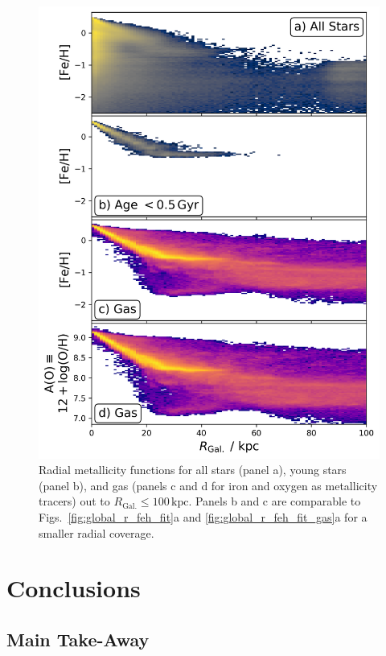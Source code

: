 \documentclass[fleqn,usenatbib]{mnras}
\begin{document}
\begin{figure}
    \centering
    \includegraphics[width=\columnwidth]{figures/trace_stars_and_gas_100kpc.png}
    \caption{Radial metallicity functions for all stars (panel a), young stars (panel b), and gas (panels c and d for iron and oxygen as metallicity tracers) out to $R_\mathrm{Gal.} \leq 100\,\mathrm{kpc}$. Panels b and c are comparable to Figs.~\ref{fig:global_r_feh_fit}a and \ref{fig:global_r_feh_fit_gas}a for a smaller radial coverage.}
    \label{fig:trace_stars_and_gas_100kpc}
\end{figure}

\section{Conclusions}
\label{sec:conc}

\subsection{Main Take-Away}
\end{document}
